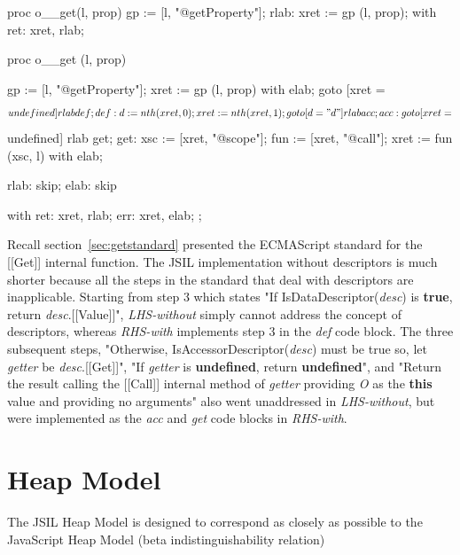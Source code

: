 \documentclass[a4paper,11pt,twoside]{report}
\begin{document}
\begin{minipage}{.45\textwidth}
\begin{lstjsil}
proc o__get(l, prop) {
          gp := [l, "@getProperty"];
    rlab: xret := gp (l, prop);
}
with
{
    ret: xret, rlab;
}
\end{lstjsil}
\end{minipage}%
\hfill
\begin{minipage}{.50\textwidth}
\begin{lstjsil}
proc o__get (l, prop) {
			gp := [l, "@getProperty"];
			xret := gp (l, prop) with elab;	
			goto [xret = $$undefined] rlab def;
			
	def:	d := nth (xret, 0);
			xret := nth (xret, 1);
			goto [d = "d"] rlab acc;
			
	acc:	goto [xret = $$undefined] rlab get;
	get:	xsc := [xret, "@scope"];
			fun := [xret, "@call"];
			xret := fun (xsc, l) with elab;
			
	rlab:	skip;
	elab:	skip
}
with
{
    ret: xret, rlab;
    err: xret, elab;
};
\end{lstjsil}
\end{minipage}

Recall section~\ref{sec:getstandard} presented the ECMAScript standard for the [[Get]] internal function. The JSIL implementation without descriptors is much shorter because all the steps in the standard that deal with descriptors are inapplicable. Starting from step 3 which states "If IsDataDescriptor(\textit{desc}) is \textbf{true}, return \textit{desc}.[[Value]]", \textit{LHS-without} simply cannot address the concept of descriptors, whereas \textit{RHS-with} implements step 3 in the \textit{def} code block. The three subsequent steps, "Otherwise, IsAccessorDescriptor(\textit{desc}) must be true so, let \textit{getter} be \textit{desc}.[[Get]]", "If \textit{getter} is \textbf{undefined}, return \textbf{undefined}", and "Return the result calling the [[Call]] internal method of \textit{getter} providing \textit{O} as the \textbf{this} value and providing no arguments" also went unaddressed in \textit{LHS-without}, but were implemented as the \textit{acc} and \textit{get} code blocks in \textit{RHS-with}.

\section{Heap Model}
The JSIL Heap Model is designed to correspond as closely as possible to the JavaScript Heap Model (beta indistinguishability relation)
\end{document}
